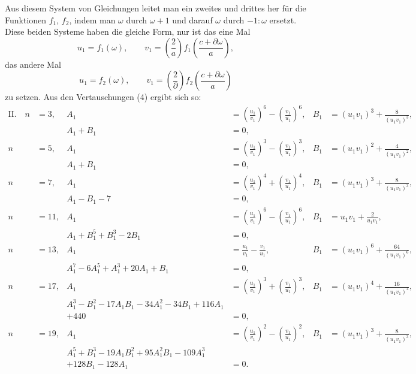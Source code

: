 Aus diesem System von Gleichungen leitet man ein zweites
und drittes her für die Funktionen $f_1$, $f_2$, indem man $\omega$ durch
$\omega + 1$ und darauf $\omega$ durch $-1:\omega$ ersetzt. Diese beiden Systeme
haben die gleiche Form, nur ist das eine Mal
\[
u_1 = f_1(\omega), \qquad v_1 = \left(\frac{2}{a}\right) f_1\left(\frac{c+\partial\omega}{a}\right),
\]
das andere Mal
\[
u_1 = f_2(\omega), \qquad v_1 = \left(\frac{2}{\partial}\right) f_2\left(\frac{c+\partial\omega}{a}\right)
\]
zu setzen. Aus den Vertauschungen (4) ergibt sich so:
{\small
\[
\begin{aligned}
\text{II.}\quad n &= 3, & A_1 &= \left(\frac{u_1}{v_1}\right)^6 - \left(\frac{v_1}{u_1}\right)^6, & B_1 &= (u_1v_1)^3 + \frac{8}{(u_1v_1)^3}, \\
& & A_1 + B_1 &= 0, \\
n &= 5, & A_1 &= \left(\frac{u_1}{v_1}\right)^3 - \left(\frac{v_1}{u_1}\right)^3, & B_1 &= (u_1v_1)^2 + \frac{4}{(u_1v_1)^2}, \\
& & A_1 + B_1 &= 0, \\
n &= 7, & A_1 &= \left(\frac{u_1}{v_1}\right)^4 + \left(\frac{v_1}{u_1}\right)^4, & B_1 &= (u_1v_1)^3 + \frac{8}{(u_1v_1)^3}, \\
& & A_1 - B_1 - 7 &= 0, \\
n &= 11, & A_1 &= \left(\frac{u_1}{v_1}\right)^6 - \left(\frac{v_1}{u_1}\right)^6, & B_1 &= u_1v_1 + \frac{2}{u_1v_1}, \\
& & A_1 + B_1^5 + B_1^3 - 2B_1 &= 0, \\
n &= 13, & A_1 &= \frac{u_1}{v_1} - \frac{v_1}{u_1}, & B_1 &= (u_1v_1)^6 + \frac{64}{(u_1v_1)^6}, \\
& & A_1^7 - 6A_1^5 + A_1^3 + 20A_1 + B_1 &= 0, \\
n &= 17, & A_1 &= \left(\frac{u_1}{v_1}\right)^3 + \left(\frac{v_1}{u_1}\right)^3, & B_1 &= (u_1v_1)^4 + \frac{16}{(u_1v_1)^4}, \\
& & A_1^3 - B_1^2 - 17A_1B_1 - 34A_1^2 - 34B_1 + 116A_1 \\
& & + 440 &= 0, \\
n &= 19, & A_1 &= \left(\frac{u_1}{v_1}\right)^2 - \left(\frac{v_1}{u_1}\right)^2, & B_1 &= (u_1v_1)^3 + \frac{8}{(u_1v_1)^3}, \\
& & A_1^5 + B_1^3 - 19A_1B_1^2 + 95A_1^2B_1 - 109A_1^3 \\
& & + 128B_1 - 128A_1 &= 0.
\end{aligned}
\]
}
